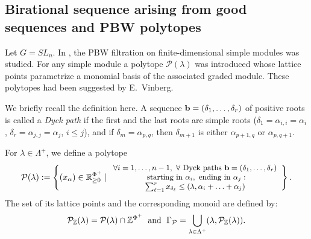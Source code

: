 \documentclass{emsprocart}
\theoremstyle{definition}
\begin{document}


\subsection{Birational sequence arising from good sequences and PBW polytopes}\label{GoodOrdering}
Let $G=SL_n$. In \cite{FFL2}, the PBW filtration on finite-dimensional simple modules was studied. For any simple module a polytope $\mathcal{P}(\lambda)$ was introduced whose lattice points parametrize a monomial basis of the associated graded module. These polytopes had been suggested by E.~Vinberg.
\par
We briefly recall the definition here. A sequence ${\bf b}=(\delta_1,\dots,\delta_r)$ of positive roots is called a {\it Dyck path} if the first and the last roots are simple roots ($\delta_1=\alpha_{i,i}=\alpha_i$, $\delta_r=\alpha_{j,j}=\alpha_j$, $i\le j$), and if $\delta_m=\alpha_{p,q}$, then $\delta_{m+1}$ is either $\alpha_{p+1,q}$ or $\alpha_{p,q+1}$.
\par
For $\lambda \in \Lambda^+$, we define a polytope
\begin{equation}\label{FFLpoly}
\mathcal{P}(\lambda)\index{$\mathcal{P}(\lambda)$, polytope arising from PBW filtration} := \left\{  (x_\alpha) \in  \mathbb R_{\ge 0}^{\Phi^+} \mid {\small
\begin{array}{c} \forall i=1,\ldots,n-1,\ \forall \text{ Dyck paths } {\bf b}=(\delta_1,\dots,\delta_r)\\ 
\text{ starting in }\alpha_i, \text{ ending in }\alpha_j:\\ 
\sum_{\ell=1}^r x_{\delta_\ell}\le (\lambda, \alpha_i + \ldots + \alpha_j)
\end{array}}
\right\}.
\end{equation}
The set of its lattice points and the corresponding monoid are defined by:
$$
\mathcal{P}_{\mathbb{Z}}(\lambda)\index{$\mathcal{P}_{\mathbb{Z}}(\lambda)$, lattice points in $\mathcal{P}(\lambda)$} = \mathcal{P}(\lambda)  \cap \mathbb{Z}^{\Phi^+} \; \text{ and } \; \Gamma_\mathcal{P}\index{$\Gamma_\mathcal{P}$, the monoid arising from PBW filtration} = \bigcup_{\lambda \in \Lambda^+} (\lambda, \mathcal{P}_{\mathbb{Z}}(\lambda)).
$$
\end{document}
